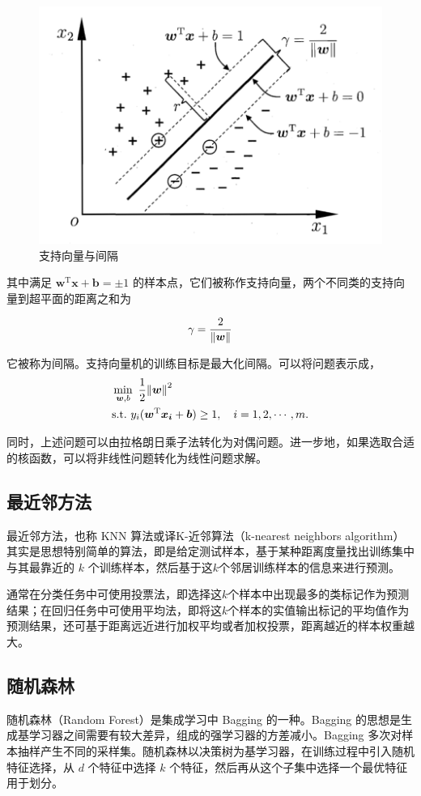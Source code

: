 \documentclass[a4paper]{article}
\begin{document}
\begin{figure}[!h]
    \centering
    \includegraphics[width=0.4\linewidth]{fig1.png}
    \caption{支持向量与间隔}
    \label{fig:svm}
\end{figure}

其中满足 $\bm{w} ^\mathrm{T} \bm{x}+\bm{b} = \pm 1$ 的样本点，它们被称作支持向量，两个不同类的支持向量到超平面的距离之和为

\begin{equation}
  \gamma = \frac{2}{\norm{\bm{w}}}
\end{equation}

它被称为间隔。支持向量机的训练目标是最大化间隔。可以将问题表示成，
\begin{equation*}
  \begin{aligned}
  & \min _{\bm{w},b} \ \frac{1}{2} \norm{\bm{w}}^2 \\
  & \mathrm{s.t.} \ y_i (\bm{w} ^\mathrm{T} \bm{x_i}+\bm{b}) \geq 1 , \quad i=1,2,\cdots,m.
    \end{aligned}
\end{equation*}

同时，上述问题可以由拉格朗日乘子法转化为对偶问题。进一步地，如果选取合适的核函数，可以将非线性问题转化为线性问题求解。

\subsection{最近邻方法}

最近邻方法，也称 KNN 算法或译K-近邻算法（k-nearest neighbors algorithm）
其实是思想特别简单的算法，即是给定测试样本，基于某种距离度量找出训练集中与其最靠近的 $k$ 个训练样本，然后基于这$k$个邻居训练样本的信息来进行预测。

通常在分类任务中可使用投票法，即选择这$k$个样本中出现最多的类标记作为预测结果；在回归任务中可使用平均法，即将这$k$个样本的实值输出标记的平均值作为预测结果，还可基于距离远近进行加权平均或者加权投票，距离越近的样本权重越大。

\subsection{随机森林}
随机森林（Random Forest）是集成学习中 Bagging 的一种。Bagging 的思想是生成基学习器之间需要有较大差异，组成的强学习器的方差减小。Bagging 多次对样本抽样产生不同的采样集。随机森林以决策树为基学习器，在训练过程中引入随机特征选择，从 $d$ 个特征中选择 $k$ 个特征，然后再从这个子集中选择一个最优特征用于划分。
\end{document}

